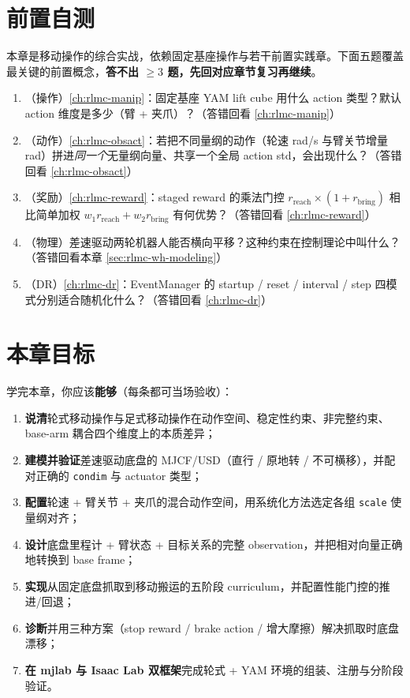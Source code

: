 \section{前置自测}
\label{sec:rlmc-wh-pretest}

本章是移动操作的综合实战，依赖固定基座操作与若干前置实践章。下面五题覆盖最关键的前置概念，\textbf{答不出 $\ge 3$ 题，先回对应章节复习再继续}。

\begin{practice}[开课前自测]
\begin{enumerate}
\item （操作）\cref{ch:rlmc-manip}：固定基座 YAM lift cube 用什么 action 类型？默认 action 维度是多少（臂 + 夹爪）？（答错回看 \cref{ch:rlmc-manip}）
\item （动作）\cref{ch:rlmc-obsact}：若把不同量纲的动作（轮速 rad/s 与臂关节增量 rad）拼进\emph{同一个}无量纲向量、共享一个全局 action std，会出现什么？（答错回看 \cref{ch:rlmc-obsact}）
\item （奖励）\cref{ch:rlmc-reward}：staged reward 的乘法门控 $r_{\text{reach}}\times(1+r_{\text{bring}})$ 相比简单加权 $w_1 r_{\text{reach}}+w_2 r_{\text{bring}}$ 有何优势？（答错回看 \cref{ch:rlmc-reward}）
\item （物理）差速驱动两轮机器人能否横向平移？这种约束在控制理论中叫什么？（答错回看本章 \cref{sec:rlmc-wh-modeling}）
\item （DR）\cref{ch:rlmc-dr}：EventManager 的 startup / reset / interval / step 四模式分别适合随机化什么？（答错回看 \cref{ch:rlmc-dr}）
\end{enumerate}
\end{practice}

\section{本章目标}
\label{sec:rlmc-wh-goals}

学完本章，你应该\textbf{能够}（每条都可当场验收）：

\begin{enumerate}
\item \textbf{说清}轮式移动操作与足式移动操作在动作空间、稳定性约束、非完整约束、base-arm 耦合四个维度上的本质差异；
\item \textbf{建模并验证}差速驱动底盘的 MJCF/USD（直行 / 原地转 / 不可横移），并配对正确的 \verb|condim| 与 actuator 类型；
\item \textbf{配置}轮速 + 臂关节 + 夹爪的混合动作空间，用系统化方法选定各组 \verb|scale| 使量纲对齐；
\item \textbf{设计}底盘里程计 + 臂状态 + 目标关系的完整 observation，并把相对向量正确地转换到 base frame；
\item \textbf{实现}从固定底盘抓取到移动搬运的五阶段 curriculum，并配置性能门控的推进/回退；
\item \textbf{诊断}并用三种方案（stop reward / brake action / 增大摩擦）解决抓取时底盘漂移；
\item \textbf{在 mjlab 与 Isaac Lab 双框架}完成轮式 + YAM 环境的组装、注册与分阶段验证。
\end{enumerate}

